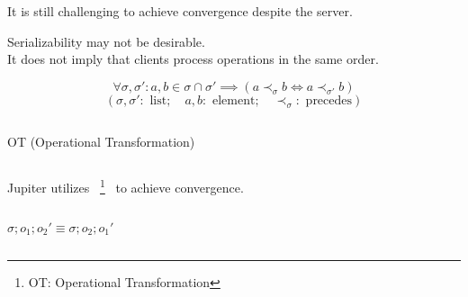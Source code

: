 \begin{frame}{}
  \centerline{It is still challenging to achieve convergence despite the server.}
  

  \begin{center}
    Serializability may not be desirable. \\[6pt]
    It does not imply that clients process operations in the same order.
  \end{center}
\end{frame}

\begin{frame}{}
  \[
    \forall \sigma, \sigma': a, b \in \sigma \cap \sigma' \implies (a \prec_{\sigma} b \iff a \prec_{\sigma'} b)
  \]
  \[
    (\sigma, \sigma': \text{ list}; \quad a, b: \text{ element}; \quad \prec_{\sigma}: \text{ precedes})
  \]

  \begin{columns}
      \vspace{-0.60cm}
      \vspace{-0.60cm}
  \end{columns}
\end{frame}

\begin{frame}{}
  \centerline{OT (Operational Transformation)~}

  \begin{columns}
      \begin{center}
	
      \end{center}
      \begin{center}
	
      \end{center}
  \end{columns}
\end{frame}

\begin{frame}{}
  \begin{center}
    {\large Jupiter utilizes ~\footnote{OT: Operational Transformation}~ to achieve convergence.}
  \end{center}

  \begin{columns}[c]
      \[
	\sigma; o_1; o_2' \equiv \sigma; o_2; o_1'
      \]
  \end{columns}
\end{frame}

